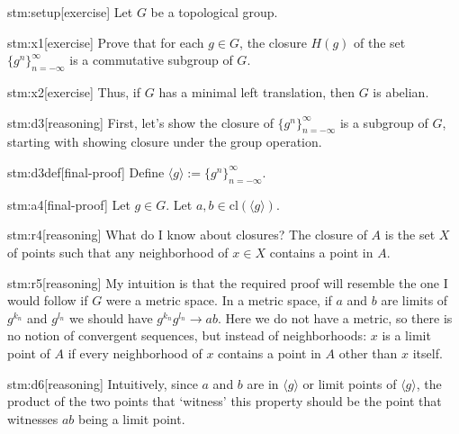 
\begin{stm}{stm:setup}[exercise]
Let $G$ be a topological group.  
\end{stm}

\begin{stm}{stm:x1}[exercise]
Prove that for each $g \in G$, the closure $H(g)$ of the set $\{g^n\}_{n=-\infty}^\infty$ is a commutative subgroup of $G$.
\end{stm}

\begin{stm}{stm:x2}[exercise]
Thus, if $G$ has a minimal left translation, then $G$ is abelian.
\end{stm}


\begin{stm}{stm:d3}[reasoning]
First, let's show the closure of $\{g^n\}_{n=-\infty}^\infty$ is a subgroup of $G$, starting with showing closure under the group operation.
\end{stm}

\begin{stm}{stm:d3def}[final-proof]
Define ${\langle g \rangle} := \{g^n\}_{n=-\infty}^\infty$.
\end{stm}

\begin{stm}{stm:a4}[final-proof]
Let $g \in G$. Let $a, b \in \mathrm{cl}({\langle g \rangle})$.
\end{stm}

\begin{stm}{stm:r4}[reasoning]
What do I know about closures? The closure of $A$ is the set $X$ of points such that any neighborhood of $x \in X$ contains a point in $A$.
\end{stm}

\begin{stm}{stm:r5}[reasoning]
My intuition is that the required proof will resemble the one I would follow if $G$ were a metric space. In a metric space, if $a$ and $b$ are limits of $g^{k_n}$ and $g^{l_n}$ we should have $g^{k_n} g^{l_n} \to ab$. Here we do not have a metric, so there is no notion of convergent sequences, but instead of neighborhoods: $x$ is a limit point of $A$ if every neighborhood of $x$ contains a point in $A$ other than $x$ itself.
\end{stm}

\begin{stm}{stm:d6}[reasoning]
Intuitively, since $a$ and $b$ are in ${\langle g \rangle}$ or limit points of ${\langle g \rangle}$, the product of the two points that ‘witness’ this property should be the point that witnesses $ab$ being a limit point.
\end{stm}

